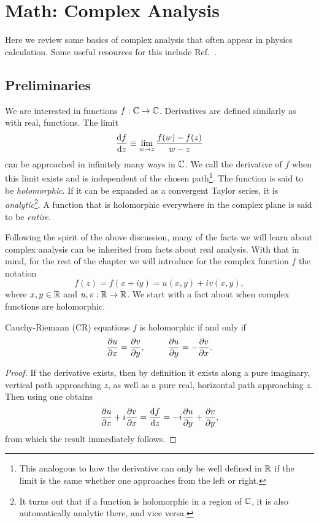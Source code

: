 \chapter{Math: Complex Analysis} 

Here we review some basics of complex analysis that often appear in physics
calculation. Some useful resources for this include
Ref.~\cite{brown_complex_2003,weber_essentials_2012}.

\section{Preliminaries}\label{sec:complexPrelim}

We are interested in functions $f:\mathbb{C}\to\mathbb{C}$. Derivatives are defined similarly as
with real,  functions. The limit
\begin{equation}\label{eq:cderiv}
  \dv{f}{z}\equiv\lim_{w\to z}\frac{f(w)-f(z)}{w-z}
\end{equation}
can be approached in infinitely many ways in $\mathbb{C}$. We call 
the derivative of $f$ when this limit exists and is independent of the chosen
path\footnote{This analogous to how the derivative can only be well defined in
$\mathbb{R}$ if the limit is the same whether one approaches from the left or right.}.
The function is said to be {\it holomorphic}. If it can be expanded as a
convergent Taylor series, it is {\it analytic}\footnote{It turns out
that if a function is holomorphic in a region of $\mathbb{C}$, it is also
automatically analytic there, and vice versa.}.
 A function that is holomorphic
everywhere in the complex plane is said to be {\it entire}.


Following the spirit of the above discussion, many of the facts we will learn
about complex analysis can be inherited from facts about real analysis. With
that in mind, for the rest of the chapter we will introduce for the complex
function $f$ the notation
\begin{equation}
  f(z)=f(x+iy)=u(x,y)+iv(x,y),
\end{equation}
where $x,y\in\mathbb{R}$ and $u,v:\mathbb{R}\to\mathbb{R}$. We start with a fact about when complex
functions are holomorphic.
\begin{theorem}{Cauchy-Riemann (CR) equations}{}
$f$ is holomorphic if and only if
$$
  \pdv{u}{x}=\pdv{v}{y},~~~~~~~~\pdv{u}{y}=-\pdv{v}{x}.
$$
\begin{proof}
If the derivative exists, then by definition
it exists along a pure imaginary, vertical path approaching $z$, as well
as a pure real, horizontal path approaching $z$.
Then using  one obtains
$$
\pdv{u}{x}+i\pdv{v}{x}=\dv{f}{z}=-i\pdv{u}{y}+\pdv{v}{y},
$$
from which the result immediately follows.
\end{proof}
\end{theorem}

